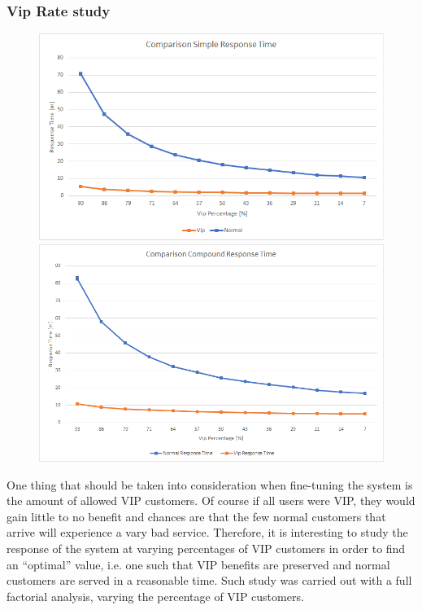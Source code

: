 \subsubsection{Vip Rate study}

\begin{figure}[h!]
  \begin{minipage}{0.48\textwidth}
    \centering
    \includegraphics[width=\textwidth]{figs/comparisonSimpleResponseTime.png}
    \caption{} %
    \label{}
  \end{minipage}\hspace{0.03\textwidth}
  \begin{minipage}{0.48\textwidth}
    \centering
    \includegraphics[width=\textwidth]{figs/comparisonCompoundResponseTime.png}
    \caption{} %
    \label{}
  \end{minipage}
\end{figure}

One thing that should be taken into consideration when fine-tuning the system is the amount of allowed VIP customers. Of course if all users were VIP, they would gain little to no benefit and chances are that the few normal customers that arrive will experience a vary bad service. Therefore, it is interesting to study the response of the system at varying percentages of VIP customers in order to find an ``optimal'' value, i.e. one such that VIP benefits are preserved and normal customers are served in a reasonable time. Such study was carried out with a full factorial analysis, varying the percentage of VIP customers.

